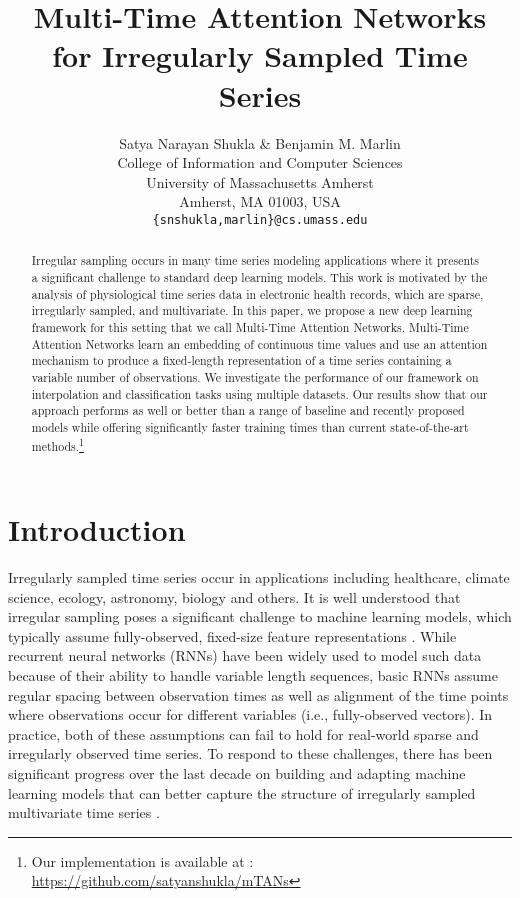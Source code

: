 \documentclass{article} \usepackage{iclr2021_conference,times}
\title{Multi-Time Attention Networks \\for Irregularly Sampled Time Series}
\author{Satya Narayan Shukla \& Benjamin M. Marlin  \\
College of Information and Computer Sciences\\
University of Massachusetts Amherst\\
Amherst, MA 01003, USA \\
\texttt{\{snshukla,marlin\}@cs.umass.edu} \\
}
\begin{document}
\maketitle
\begin{abstract}
Irregular sampling occurs in many time series modeling applications where it presents a significant challenge to standard deep learning models. This work is motivated by the analysis of physiological time series data in electronic health records, which are sparse, irregularly sampled, and multivariate. In this paper, we propose a new deep learning framework for this setting that we call Multi-Time Attention Networks. Multi-Time Attention Networks learn an embedding of continuous time values and use an attention mechanism to produce a fixed-length representation of a time series containing a variable number of observations. We investigate the performance of our framework on interpolation and classification tasks using multiple datasets. Our results show that our approach performs as well or better than a range of baseline and recently proposed models while offering significantly faster training times than current state-of-the-art methods.\footnote{Our implementation is available at : \url{https://github.com/satyanshukla/mTANs}}
\end{abstract} \section{Introduction}

Irregularly sampled time series occur in applications including healthcare, climate science, ecology, astronomy, biology and others.
It is well understood that irregular sampling poses a significant challenge to machine learning models, which typically assume fully-observed, fixed-size  feature representations \citep{yadav2018mining}. While recurrent neural networks (RNNs) have been widely used to model such data because of their ability to handle variable length sequences, basic RNNs assume regular spacing between observation times as well as alignment of the time points where observations occur for different variables (i.e., fully-observed vectors). In practice, both of these assumptions can fail to hold for real-world sparse and irregularly observed time series. To respond to these challenges, there has been significant progress over the last decade on building and adapting machine learning models that can better capture the structure of irregularly sampled multivariate time series \citep{marlin-ihi2012, li2015classification, li2016scalable, lipton2016directly,  futoma2017improved, che2016recurrent, shukla2019, Rubanova2019}.
\end{document}
